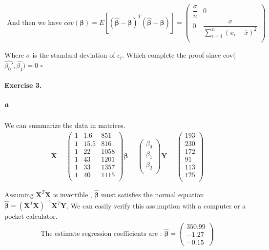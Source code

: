 \documentclass{article}
\begin{document}
\begin{align*}
\text{And then we have }
cov(\pmb{\beta})=E\left[  (\pmb{\widehat{\beta}}-\pmb{\beta})^T(\pmb{\widehat{\beta}}-\pmb{\beta})\right]=
\begin{pmatrix}
\dfrac{\sigma}{n} & 0 \\
0 & \dfrac{\sigma}{\sum_{i=1}^n (x_i-\overline{x})^2} \\
\end{pmatrix}
\end{align*}

Where $ \sigma $ is the standard deviation of $\epsilon_i$.
Which complete the proof since cov($\widehat{\beta_0 '},\widehat{\beta_1})=0$ $\square$

\paragraph{Exercise 3.}
\subparagraph{a}

We can summarize the data in matrices.
\begin{align*}
\pmb{X}=
\begin{pmatrix}
1 & 1.6 & 851 \\
1 & 15.5 & 816 \\
1 & 22 & 1058 \\
1 & 43 & 1201 \\
1 & 33 & 1357 \\
1 & 40 & 1115 \\
\end{pmatrix}
\pmb{\beta}=
\begin{pmatrix}
\beta_0 \\
\beta_1 \\
\beta_2 \\
\end{pmatrix}
\pmb{Y}=
\begin{pmatrix}
193 \\
230 \\
172 \\
91 \\
113 \\
125 \\
\end{pmatrix}
\end{align*}

Assuming $\pmb{X}^T \pmb{X}$ is invertible , $\widehat{\pmb{\beta}}$ must satisfies the normal equation $\pmb{\widehat{\beta}}=(\pmb{X}^T \pmb{X})^{-1} \pmb{X}^T \pmb{Y}$. We can easily verify this assumption with a computer or a pocket calculator.\\
\begin{align*}
\text{The estimate regression coefficients are : }
\widehat{\pmb{\beta}}=
\begin{pmatrix}
350.99 \\
-1.27 \\
-0.15 
\end{pmatrix}
\end{align*}
\end{document}
